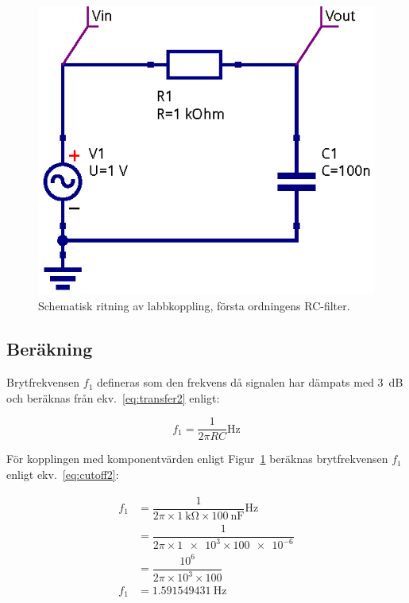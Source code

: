 \begin{figure}\label{fig:rc-schema}
  \centering
  \includegraphics[width=0.8\linewidth]{sim/ee466_lab-4_prj/uppgift-0_schema}
  \caption[Schematisk ritning av labbkoppling, första ordningens RC-filter.]
  {Schematisk ritning av labbkoppling, första ordningens RC-filter.}
\end{figure}


\subsection{Beräkning}
Brytfrekvensen $f_1$ defineras som den frekvens då signalen har dämpats med
\SI{3}{\dB} och beräknas från ekv.~\eqref{eq:transfer2} enligt:

\begin{equation}\label{eq:cutoff}
  f_1 = \dfrac{1}{2 \pi R C} \si{\Hz}
\end{equation}

För kopplingen med komponentvärden enligt Figur~\ref{fig:rc-schema} beräknas
brytfrekvensen $f_1$ enligt ekv.~\eqref{eq:cutoff2}:

\begin{equation}\label{eq:cutoff2}
  \begin{split}
    f_1 &= \dfrac{1}{2 \pi \times \SI{1}{\kohm} \times \SI{100}{\nano\farad}} \si{\Hz} \\
        &= \dfrac{1}{2 \pi \times \num{1e3} \times \num{100e-6}}                       \\
        &= \dfrac{10^6}{2 \pi \times 10^3 \times \num{100}}                            \\
    f_1 &= \SI{1.591549431}{\Hz}
  \end{split}
\end{equation}

